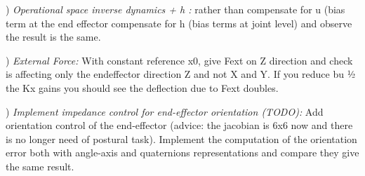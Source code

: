 \documentclass{report}
\begin{document}
\quad

) \textit{Operational space inverse dynamics + h :}
rather than compensate for u (bias term at the end effector  compensate for h (bias terms at joint level) and observe the result is the same.

\quad

) \textit{External Force:}
With constant reference x0,  give Fext on Z direction and check is affecting only the endeffector direction Z and not X and Y. If you reduce bu ½ the Kx gains you should see the deflection due to Fext doubles.

\quad

) \textit{Implement impedance control for end-effector orientation (TODO):}
Add orientation  control of the end-effector (advice: the jacobian is 6x6 now and there is no longer need of postural task). Implement the computation of the orientation error both with angle-axis and quaternions representations and compare they give the same result.

 
\end{document}
